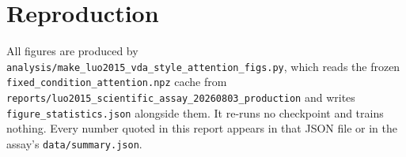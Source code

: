 \documentclass[10pt]{article}
\begin{document}
\section*{Reproduction}

All figures are produced by
\texttt{analysis/make\_luo2015\_vda\_style\_attention\_figs.py}, which reads the frozen
\texttt{fixed\_condition\_attention.npz} cache from
\texttt{reports/luo2015\_scientific\_assay\_20260803\_production} and writes
\texttt{figure\_statistics.json} alongside them. It re-runs no checkpoint and trains nothing.
Every number quoted in this report appears in that JSON file or in the assay's
\texttt{data/summary.json}.
\end{document}
